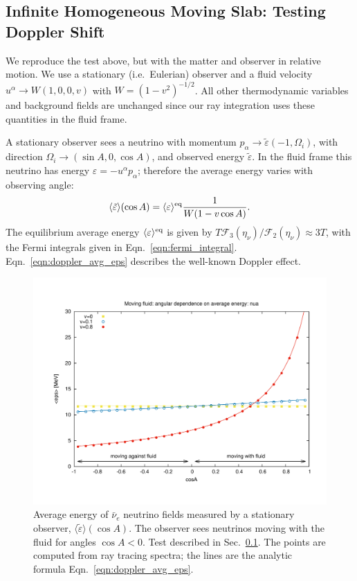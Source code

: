 \documentclass[aps,floatfix,prd,superscriptaddress,twocolumn]{revtex4-1}
\begin{document}
\subsection{Infinite Homogeneous Moving Slab:
  Testing Doppler Shift}
\label{ssec:test_doppler}
We reproduce the test above, but with the matter and observer in relative
motion.
We use a stationary (i.e.\ Eulerian) observer
and a fluid velocity $u^\alpha \rightarrow W(1,0,0,v)$ with $W=(1-v^2)^{-1/2}$.
All other thermodynamic variables and background fields are unchanged
since our ray integration uses these quantities in the fluid frame.

A stationary observer sees a neutrino with momentum
$p_\alpha \rightarrow \tilde{\varepsilon}(-1,\Omega_i)$,
with direction $\Omega_i \rightarrow (\sin A, 0, \cos A)$,
and observed energy $\tilde{\varepsilon}$.
In the fluid frame this neutrino has energy $\varepsilon=-u^\alpha p_\alpha$;
therefore the average energy varies with observing angle:
\begin{equation}
  \label{eqn:doppler_avg_eps}
  \langle \tilde{\varepsilon} \rangle(\cos A) =
  \langle \varepsilon \rangle^{\rm eq} \frac{1}{W(1-v \cos A)}.
\end{equation}
The equilibrium average energy $\langle \varepsilon \rangle^{\rm eq}$
is given by $T \mathscr{F}_3(\eta_\nu)/\mathscr{F}_2(\eta_\nu)\approx 3T$,
with the Fermi integrals given in Eqn.~\ref{eqn:fermi_integral}.
Eqn.~\ref{eqn:doppler_avg_eps} describes the well-known Doppler effect.

\begin{figure}
  \includegraphics[width=\columnwidth]{fig-moving_fluid_avg_eps}
  \caption{Average energy of $\bar{\nu}_e$ neutrino fields
    measured by a stationary observer,
    $\langle\tilde{\varepsilon}\rangle(\cos A)$.
    The observer sees neutrinos moving with the fluid for angles $\cos A<0$.
    Test described in Sec.~\ref{ssec:test_doppler}.
    The points are computed from ray tracing spectra; the lines are the
    analytic formula Eqn.~\ref{eqn:doppler_avg_eps}.
  }
  \label{fig:avg_eps_doppler}
\end{figure}
\end{document}

